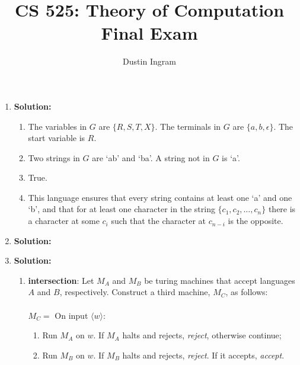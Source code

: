\documentclass{article}
\title{CS 525: Theory of Computation\\ Final Exam}
\author{Dustin Ingram}
\begin{document}
\maketitle
\begin{enumerate}
    \item \textbf{Solution:}
        \begin{enumerate}
            \item The variables in $G$ are $\{R, S, T, X\}$. The terminals in $G$ are $\{a, b, \epsilon\}$. The start variable is $R$.
            \item Two strings in $G$ are `ab' and `ba'. A string not in $G$ is `a'.
            \item True.
            \item This language ensures that every string contains at least one `a' and one `b', and that for at least one character in the string $\{c_{1}, c_{2}, \dots, c_{n}\}$ there is a character at some $c_{i}$ such that the character at $c_{n-i}$ is the opposite.
        \end{enumerate}
    \item \textbf{Solution:}
        \begin{figure}[!h]
            \centering
        \end{figure}

    \item \textbf{Solution:}
        \begin{enumerate}
            \item \textbf{intersection}: Let $M_{A}$ and $M_{B}$ be turing machines that accept languages $A$ and $B$, respectively. Construct a third machine, $M_{C}$, as follows: \\ \\
            $M_{C} = $ On input $\langle w \rangle$: 
            \begin{enumerate}
                \item Run $M_{A}$ on $w$. If $M_{A}$ halts and rejects, \emph{reject}, otherwise continue; 
                \item Run $M_{B}$ on $w$. If $M_{B}$ halts and rejects, \emph{reject}. If it accepts, \emph{accept}.
            \end{enumerate}


\end{enumerate}
\end{enumerate}
\end{document}
